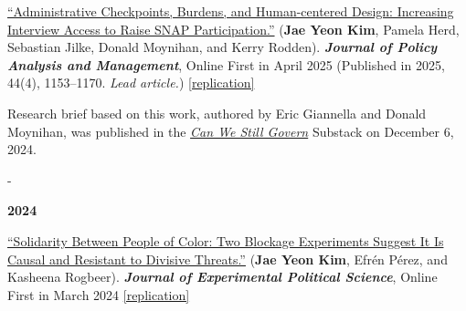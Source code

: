 \documentclass[10pt, letterpaper]{article}
\makeatletter
\newcommand{\needspace}[1]{%
  \par\penalty-100\begingroup
  \setlength{\dimen@}{#1}%
  \dimen@ii\pagegoal \advance\dimen@ii-\pagetotal
  \ifdim\dimen@>\dimen@ii \break\fi
  \endgroup
}
\newcommand{\pubyear}[1]{\needspace{6\baselineskip}\item[]\vspace{0.3\baselineskip}\textbf{#1}}
\renewenvironment{itemize}{
\begin{list}{}{
        \setlength{\leftmargin}{1.5em}
        \setlength{\itemsep}{0.10em}
        \setlength{\parskip}{0pt}
        \setlength{\parsep}{0.10em}
    }
}{
\end{list}
}
\makeatother
\begin{document}
\begin{etaremune}
\item \href{https://onlinelibrary.wiley.com/doi/full/10.1002/pam.70007?fbclid=IwY2xjawJaKWFleHRuA2FlbQIxMAABHfrqWiIxjaUVOIIe5m616cc3zDEulBp9iQ97XAagyGv1LKgaj3UiFdpXSw_aem_5XiHzAKcQfxO3LuQJMT0Iw}{``Administrative Checkpoints, Burdens, and Human-centered Design: Increasing Interview Access to Raise SNAP Participation.''} (\textbf{Jae Yeon Kim}, Pamela Herd, Sebastian Jilke, Donald Moynihan, and Kerry Rodden). \textbf{\textit{Journal of Policy Analysis and Management}}, Online First in April 2025 (Published in 2025, 44(4), 1153--1170. \textit{Lead article.}) \href{https://osf.io/w87h2/?view_only=None}{[replication]}
\begin{itemize}
    \item Research brief based on this work, authored by Eric Giannella and Donald Moynihan, was published in the \textit{\href{https://donmoynihan.substack.com/p/making-snap-interviews-more-flexible}{Can We Still Govern}} Substack on December 6, 2024.
\end{itemize}

\pubyear{2024}
\item \href{https://www.cambridge.org/core/journals/journal-of-experimental-political-science/article/solidarity-between-people-of-color-two-blockage-experiments-suggest-it-is-causal-and-resistant-to-a-divisive-threat/3CEAFE3E375FD48D7B5235917CB91D51}{``Solidarity Between People of Color: Two Blockage Experiments Suggest It Is Causal and Resistant to Divisive Threats.''} (\textbf{Jae Yeon Kim}, Efrén Pérez, and Kasheena Rogbeer). \textbf{\textit{Journal of Experimental Political Science}}, Online First in March 2024 \href{https://doi.org/10.7910/DVN/UWJYCB}{[replication]}


\end{etaremune}
\end{document}
